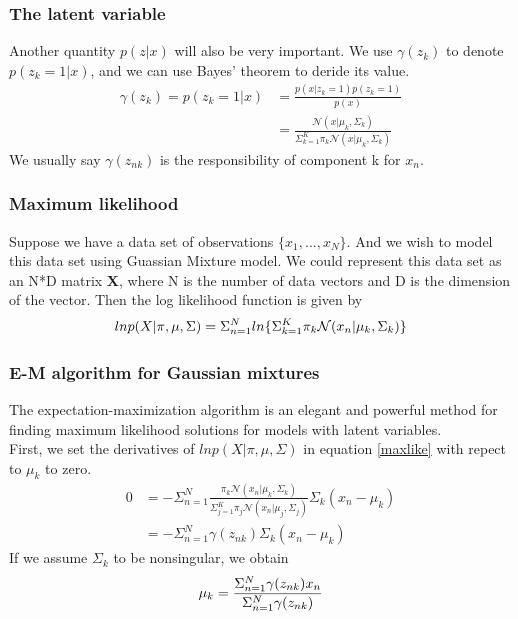 \documentclass{beamer}
\begin{document}
\begin{frame}
\frametitle{The latent variable}
Another quantity $p(z|x)$ will also be very important. We use $\gamma (z_k)$ to denote $p(z_k=1|x)$, and we can use Bayes' theorem to deride its value.
\begin{equation}
\begin{split}
\gamma (z_k) = p(z_k=1|x) 
&= \frac{p(x|z_k=1)p(z_k=1)}{p(x)} \\
&= \frac{\mathcal{N}(x|\mu_k, \Sigma_k)}{\Sigma^K_{k=1}\pi_k\mathcal{N}(x|\mu_k,\Sigma_k)}
\end{split}
\end{equation}
We usually say $\gamma(z_{nk})$ is the responsibility of component k for $x_n$.
\end{frame}

\begin{frame}
\frametitle{Maximum likelihood}
Suppose we have a data set of observations $\{x_1,...,x_N\}$. And we wish to model this data set using Guassian Mixture model. We could represent this data set as an N*D matrix \textbf{X}, where N is the number of data vectors and D is the dimension of the vector. Then the log likelihood function is given by
\begin{equation}{\label{maxlike}}
lnp(X|\pi,\mu,\Sigma)=\Sigma^N_{n=1}ln\{\Sigma^K_{k=1}\pi_k
\mathcal{N}(x_n|\mu_k,\Sigma_k)\}
\end{equation}
\end{frame}

\begin{frame}
\frametitle{E-M algorithm for Gaussian mixtures}
The expectation-maximization algorithm is an elegant and powerful method for finding maximum likelihood solutions for models with latent variables.\\
First, we set the derivatives of $lnp(X|\pi,\mu,\Sigma)$ in equation \ref{maxlike} with repect to $\mu_k$ to zero.
\begin{equation}
\begin{split}
0&=-\Sigma^N_{n=1}\frac{\pi_k\mathcal{N}(x_n|\mu_k,\Sigma_k)}{\Sigma^K_{j=1}\pi_j
\mathcal{N}(x_n|\mu_j,\Sigma_j)}\Sigma_k(x_n-\mu_k)\\
&=-\Sigma^N_{n=1}\gamma(z_{nk})\Sigma_k(x_n-\mu_k)
\end{split}
\end{equation}
If we assume $\Sigma_k$ to be nonsingular, we obtain
\begin{equation}{\label{m1}}
\mu_k=\frac{\Sigma^{N}_{n=1}\gamma(z_{nk})x_n}{\Sigma^{N}_{n=1}\gamma(z_{nk})}
\end{equation}
\end{frame}
\end{document}
